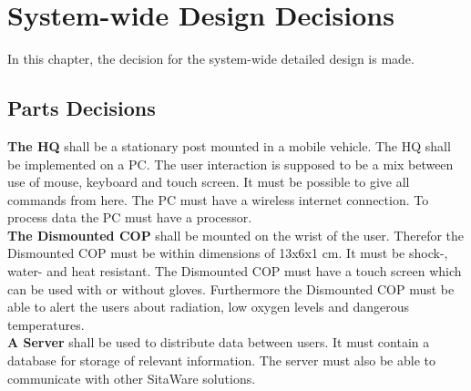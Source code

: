 \chapter{System-wide Design Decisions}

In this chapter, the decision for the system-wide detailed design is made.
\section{Parts Decisions}
\textbf{The HQ} shall be a stationary post mounted in a mobile vehicle. The HQ shall be implemented on a PC. The user interaction is supposed to be a mix between use of mouse, keyboard and touch screen. It must be possible to give all commands from here. The PC must have a wireless internet connection. To process data the PC must have a processor.\\

\textbf{The Dismounted COP} shall be mounted on the wrist of the user. Therefor the Dismounted COP must be within dimensions of 13x6x1 cm. It must be shock-, water- and heat resistant. The Dismounted COP must have a touch screen which can be used with or without gloves. Furthermore the Dismounted COP must be able to alert the users about radiation, low oxygen levels and dangerous temperatures.\\

\textbf{A Server} shall be used to distribute data between users. It must contain a database for storage of relevant information. The server must also be able to communicate with other SitaWare solutions.\\

